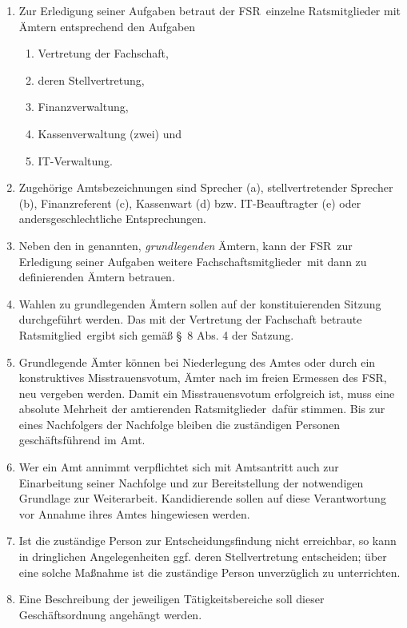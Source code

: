 \documentclass[a4paper, 12pt, ngerman]{article}
\newcommand{\rat}{FSR}
\newcommand{\rates}{FSR}
\newcommand{\mitglieder}{Ratsmitglieder}
\newcommand{\mitglied}{Ratsmitglied}
\newcommand{\fsmitglieder}{Fachschaftsmitglieder}
\begin{document}
\begin{enumerate}[leftmargin=0cm]
	\begin{enumerate}[leftmargin=0cm]
		\item Zur Erledigung seiner Aufgaben betraut der \rat~einzelne Ratsmitglieder mit Ämtern entsprechend den Aufgaben\label{Amter.grundl}
			\begin{enumerate}[leftmargin=0.5cm]
				\item Vertretung der Fachschaft,
				\item deren Stellvertretung,
				\item Finanzverwaltung,
				\item Kassenverwaltung (zwei) und
				\item IT-Verwaltung.\label{Amt:IT}
			\end{enumerate}
		\item Zugehörige Amtsbezeichnungen sind Sprecher (a), stellvertretender Sprecher (b), Finanzreferent (c), Kassenwart (d) bzw. IT-Beauftragter (e) oder andersgeschlechtliche Entsprechungen.
		\item Neben den in  genannten, \textit{grundlegenden} Ämtern, kann der \rat~zur Erledigung seiner Aufgaben weitere 
		\fsmitglieder~mit dann zu definierenden Ämtern betrauen.\label{weitereAmter}
		\item Wahlen zu grundlegenden Ämtern sollen auf der konstituierenden Sitzung durchgeführt werden. Das mit der Vertretung der Fachschaft betraute \mitglied~ergibt sich gemäß §~8 Abs. 4 der Satzung.\label{amtswahlzeit}
		\item Grundlegende Ämter können bei Niederlegung des Amtes oder durch ein konstruktives Misstrauensvotum, Ämter nach  im freien Ermessen des \rates, neu vergeben werden. Damit ein Misstrauensvotum erfolgreich ist,  muss eine absolute Mehrheit der amtierenden \mitglieder~dafür stimmen. Bis zur eines Nachfolgers der Nachfolge bleiben die zuständigen Personen geschäftsführend im Amt.
		\item Wer ein Amt annimmt verpflichtet sich mit Amtsantritt auch zur Einarbeitung seiner Nachfolge und zur Bereitstellung der notwendigen Grundlage zur Weiterarbeit. Kandidierende sollen auf diese Verantwortung vor Annahme ihres Amtes hingewiesen werden.
		\item Ist die zuständige Person zur Entscheidungsfindung nicht erreichbar, so kann in dringlichen Angelegenheiten ggf. deren Stellvertretung entscheiden; über eine solche Maßnahme ist die zuständige Person unverzüglich zu unterrichten.
		\item Eine Beschreibung der jeweiligen Tätigkeitsbereiche soll dieser Geschäftsordnung angehängt werden.
	\end{enumerate}


\end{enumerate}
\end{document}
